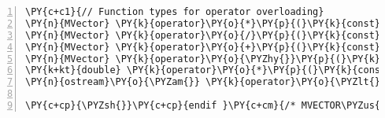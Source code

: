 \begin{Verbatim}[tabsize=2,commandchars=\\\{\},numbers=left,firstnumber=1,stepnumber=1]
\PY{c+c1}{// Function types for operator overloading}
\PY{n}{MVector} \PY{k}{operator}\PY{o}{*}\PY{p}{(}\PY{k}{const} \PY{k+kt}{double}\PY{o}{\PYZam{}} \PY{n}{lhs}\PY{p}{,} \PY{k}{const} \PY{n}{MVector}\PY{o}{\PYZam{}} \PY{n}{rhs}\PY{p}{)}\PY{p}{;}
\PY{n}{MVector} \PY{k}{operator}\PY{o}{/}\PY{p}{(}\PY{k}{const} \PY{n}{MVector}\PY{o}{\PYZam{}} \PY{n}{lhs}\PY{p}{,} \PY{k}{const} \PY{k+kt}{double}\PY{o}{\PYZam{}} \PY{n}{rhs}\PY{p}{)}\PY{p}{;}
\PY{n}{MVector} \PY{k}{operator}\PY{o}{+}\PY{p}{(}\PY{k}{const} \PY{n}{MVector}\PY{o}{\PYZam{}} \PY{n}{lhs}\PY{p}{,} \PY{k}{const} \PY{n}{MVector}\PY{o}{\PYZam{}} \PY{n}{rhs}\PY{p}{)}\PY{p}{;}
\PY{n}{MVector} \PY{k}{operator}\PY{o}{\PYZhy{}}\PY{p}{(}\PY{k}{const} \PY{n}{MVector}\PY{o}{\PYZam{}} \PY{n}{lhs}\PY{p}{,} \PY{k}{const} \PY{n}{MVector}\PY{o}{\PYZam{}} \PY{n}{rhs}\PY{p}{)}\PY{p}{;}
\PY{k+kt}{double} \PY{k}{operator}\PY{o}{*}\PY{p}{(}\PY{k}{const} \PY{n}{MVector}\PY{o}{\PYZam{}} \PY{n}{lhs}\PY{p}{,} \PY{k}{const} \PY{n}{MVector}\PY{o}{\PYZam{}} \PY{n}{rhs}\PY{p}{)}\PY{p}{;}
\PY{n}{ostream}\PY{o}{\PYZam{}} \PY{k}{operator}\PY{o}{\PYZlt{}}\PY{o}{\PYZlt{}}\PY{p}{(}\PY{n}{ostream}\PY{o}{\PYZam{}} \PY{n}{os}\PY{p}{,} \PY{k}{const} \PY{n}{MVector}\PY{o}{\PYZam{}} \PY{n}{v}\PY{p}{)}\PY{p}{;}

\PY{c+cp}{\PYZsh{}}\PY{c+cp}{endif }\PY{c+cm}{/* MVECTOR\PYZus{}HPP\PYZus{} */}
\end{Verbatim}
